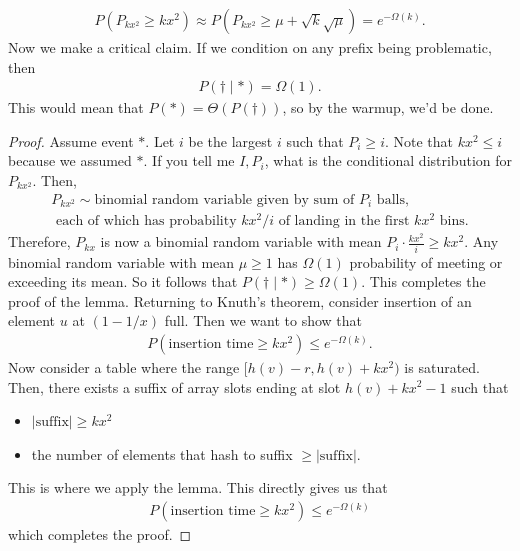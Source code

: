 \documentclass{report}
\begin{document}
\begin{align*}
    P(P_{kx^2} \geq kx^2) \approx P(P_{kx^2} \geq \mu + \sqrt k \sqrt \mu) = e^{-\Omega(k)}.
\end{align*}
Now we make a critical claim. If we condition on any prefix being problematic, then
\begin{align*}
    P(\dagger \mid *) = \Omega(1).
\end{align*}
This would mean that $P(*) = \Theta(P(\dagger))$, so by the warmup, we'd be done.
\begin{proof}
    Assume event $*$. Let $i$ be the largest $i$ such that $P_i \geq i$. Note that $kx^2 \leq i$ because we assumed $*$. If you tell me $I, P_i$, what is the conditional distribution for $P_{kx^2}$. Then,
    \begin{align*}
        P_{kx^2} \sim \text{binomial random variable given by sum of $P_i$ balls,} \\
        \text{ each of which has probability $kx^2/i$ of landing in the first $kx^2$ bins.}
    \end{align*}
    Therefore, $P_{kx}$ is now a binomial random variable with mean $P_i \cdot \frac{kx^2}{i} \geq kx^2$. Any binomial random variable with mean $\mu \geq 1$ has $\Omega(1)$ probability of meeting or exceeding its mean. So it follows that $P(\dagger \mid *) \geq \Omega(1)$.  This completes the proof of the lemma.
    \newpage
    \noindent Returning to Knuth's theorem, consider insertion of an element $u$ at $(1 - 1/x)$ full. Then we want to show that
    \begin{align*}
        P(\text{insertion time} \geq kx^2) \leq e^{-\Omega(k)}.
    \end{align*}
    Now consider a table where the range $[h(v) -r, h(v) + kx^2)$ is saturated. Then, there exists a suffix of array slots ending at slot $h(v) + kx^2 - 1$ such that 
    \begin{itemize}
        \item $|\text{suffix}| \geq kx^2$
        \item the number of elements that hash to suffix $\geq |\text{suffix}|$.
    \end{itemize}
    This is where we apply the lemma. This directly gives us that 
    \begin{align*}
        P(\text{insertion time} \geq kx^2) \leq e^{-\Omega(k)}
    \end{align*}
    which completes the proof.  
\end{proof}
\end{document}
